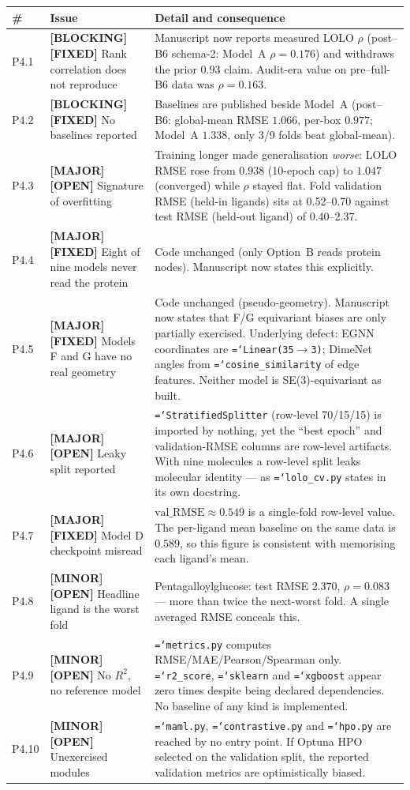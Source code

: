 \documentclass[11pt,a4paper]{article}
\newcommand{\ok}[1]{\textcolor{okgreen}{#1}}
\newcommand{\bad}[1]{\textcolor{badred}{#1}}
\newcommand{\warn}[1]{\textcolor{warnamber}{#1}}
\newcommand{\code}[1]{\texttt{\small\hyphenchar\font=`\-\relax #1}}
\newcommand{\SBLOCK}{\bad{\textbf{[BLOCKING]}}}
\newcommand{\SMAJOR}{\warn{\textbf{[MAJOR]}}}
\newcommand{\SMINOR}{\textbf{[MINOR]}}
\newcommand{\SFIXED}{\ok{\textbf{[FIXED]}}}
\newcommand{\SOPEN}{\bad{\textbf{[OPEN]}}}
\begin{document}
\begin{longtable}{@{}L{0.6cm}L{5.2cm}L{8.6cm}@{}}
\toprule
\textbf{\#} & \textbf{Issue} & \textbf{Detail and consequence} \\
\midrule
\endhead
P4.1 & \SBLOCK{} \SFIXED{} Rank correlation does not reproduce &
  Manuscript now reports measured LOLO $\rho$ (post--B6 schema-2:
  Model~A $\rho = 0.176$) and withdraws the prior $0.93$ claim.
  Audit-era value on pre--full-B6 data was $\rho = 0.163$. \\
P4.2 & \SBLOCK{} \SFIXED{} No baselines reported &
  Baselines are published beside Model~A (post--B6: global-mean RMSE
  $1.066$, per-box $0.977$; Model~A $1.338$, only 3/9 folds beat
  global-mean). \\
P4.3 & \SMAJOR{} \SOPEN{} Signature of overfitting &
  Training longer made generalisation \emph{worse}: LOLO RMSE rose from
  $0.938$ (10-epoch cap) to $1.047$ (converged) while $\rho$ stayed flat.
  Fold validation RMSE (held-in ligands) sits at 0.52--0.70 against test RMSE
  (held-out ligand) of 0.40--2.37. \\
P4.4 & \SMAJOR{} \SFIXED{} Eight of nine models never read the protein &
  Code unchanged (only Option~B reads protein nodes). Manuscript now
  states this explicitly. \\
P4.5 & \SMAJOR{} \SFIXED{} Models F and G have no real geometry &
  Code unchanged (pseudo-geometry). Manuscript now states that F/G
  equivariant biases are only partially exercised. Underlying defect:
  EGNN coordinates are \code{Linear(35$\to$3)}; DimeNet angles from
  \code{cosine\_similarity} of edge features. Neither
  model is SE(3)-equivariant as built. \\
P4.6 & \SMAJOR{} \SOPEN{} Leaky split reported &
  \code{StratifiedSplitter} (row-level 70/15/15) is imported by nothing, yet
  the ``best epoch'' and validation-RMSE columns are row-level artifacts.
  With nine molecules a row-level split leaks molecular identity --- as
  \code{lolo\_cv.py} states in its own docstring. \\
P4.7 & \SMAJOR{} \SFIXED{} Model D checkpoint misread &
  $\text{val\_RMSE}\approx 0.549$ is a single-fold row-level value. The
  per-ligand mean baseline on the same data is $0.589$, so this figure is
  consistent with memorising each ligand's mean. \\
P4.8 & \SMINOR{} \SOPEN{} Headline ligand is the worst fold &
  Pentagalloylglucose: test RMSE $2.370$, $\rho = 0.083$ --- more than twice
  the next-worst fold. A single averaged RMSE conceals this. \\
P4.9 & \SMINOR{} \SOPEN{} No $R^2$, no reference model &
  \code{metrics.py} computes RMSE/MAE/Pearson/Spearman only. \code{r2\_score},
  \code{sklearn} and \code{xgboost} appear zero times despite being declared
  dependencies. No baseline of any kind is implemented. \\
P4.10 & \SMINOR{} \SOPEN{} Unexercised modules &
  \code{maml.py}, \code{contrastive.py} and \code{hpo.py} are reached by no
  entry point. If Optuna HPO selected on the validation split, the reported
  validation metrics are optimistically biased. \\
\bottomrule
\end{longtable}
\end{document}
